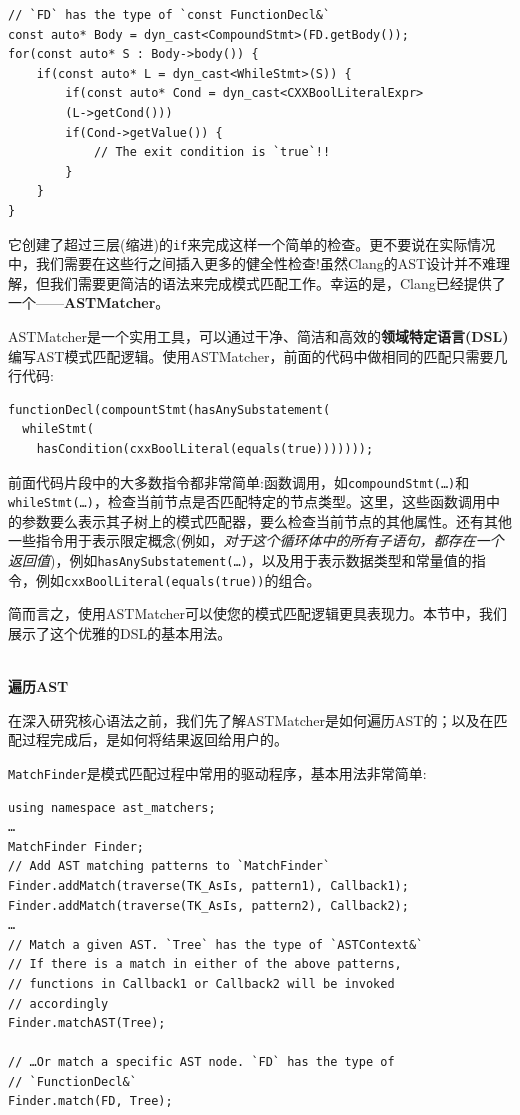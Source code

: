\begin{lstlisting}[style=styleCXX]
// `FD` has the type of `const FunctionDecl&`
const auto* Body = dyn_cast<CompoundStmt>(FD.getBody());
for(const auto* S : Body->body()) {
	if(const auto* L = dyn_cast<WhileStmt>(S)) {
		if(const auto* Cond = dyn_cast<CXXBoolLiteralExpr>
		(L->getCond()))
		if(Cond->getValue()) {
			// The exit condition is `true`!!
		}
	}
}
\end{lstlisting}

它创建了超过三层(缩进)的\texttt{if}来完成这样一个简单的检查。更不要说在实际情况中，我们需要在这些行之间插入更多的健全性检查!虽然Clang的AST设计并不难理解，但我们需要更简洁的语法来完成模式匹配工作。幸运的是，Clang已经提供了一个——\textbf{ASTMatcher}。

ASTMatcher是一个实用工具，可以通过干净、简洁和高效的\textbf{领域特定语言(DSL)}编写AST模式匹配逻辑。使用ASTMatcher，前面的代码中做相同的匹配只需要几行代码:

\begin{lstlisting}[style=styleCXX]
functionDecl(compountStmt(hasAnySubstatement(
  whileStmt(
    hasCondition(cxxBoolLiteral(equals(true)))))));
\end{lstlisting}

前面代码片段中的大多数指令都非常简单:函数调用，如\texttt{compoundStmt(…)}和\texttt{whileStmt(…)}，检查当前节点是否匹配特定的节点类型。这里，这些函数调用中的参数要么表示其子树上的模式匹配器，要么检查当前节点的其他属性。还有其他一些指令用于表示限定概念(例如，\textit{对于这个循环体中的所有子语句，都存在一个返回值})，例如\texttt{hasAnySubstatement(…)}，以及用于表示数据类型和常量值的指令，例如\texttt{cxxBoolLiteral(equals(true))}的组合。

简而言之，使用ASTMatcher可以使您的模式匹配逻辑更具表现力。本节中，我们展示了这个优雅的DSL的基本用法。

\hspace*{\fill} \\ %
\noindent
\textbf{遍历AST}

在深入研究核心语法之前，我们先了解ASTMatcher是如何遍历AST的；以及在匹配过程完成后，是如何将结果返回给用户的。

\texttt{MatchFinder}是模式匹配过程中常用的驱动程序，基本用法非常简单:

\begin{lstlisting}[style=styleCXX]
using namespace ast_matchers;
…
MatchFinder Finder;
// Add AST matching patterns to `MatchFinder`
Finder.addMatch(traverse(TK_AsIs, pattern1), Callback1);
Finder.addMatch(traverse(TK_AsIs, pattern2), Callback2);
…
// Match a given AST. `Tree` has the type of `ASTContext&`
// If there is a match in either of the above patterns,
// functions in Callback1 or Callback2 will be invoked
// accordingly
Finder.matchAST(Tree);

// …Or match a specific AST node. `FD` has the type of
// `FunctionDecl&`
Finder.match(FD, Tree);
\end{lstlisting}

